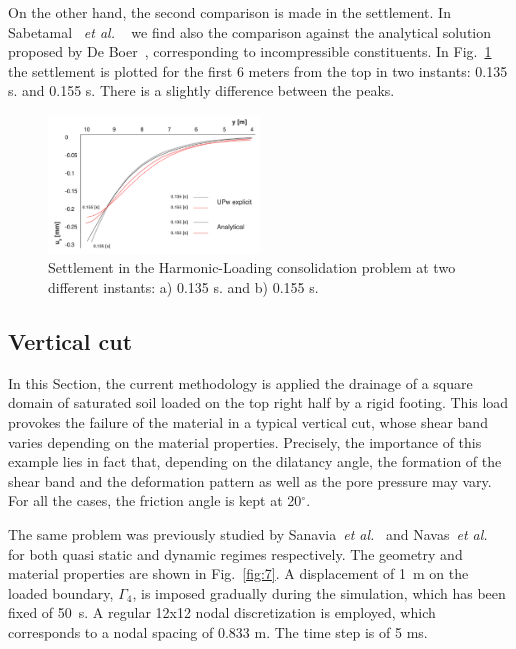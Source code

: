 \documentclass[twocolumn]{svjour3}          %
\newcommand{\etal}{
  \textit{et al.}
}
\begin{document}
On the other hand, the second comparison is made in the settlement. In Sabetamal~\etal~\cite{Sabetamal:2015} we find also the comparison against the analytical solution proposed by De Boer~\cite{deBoer:93}, corresponding to incompressible constituents. In Fig.~\ref{fig_con6} the settlement is plotted for the first 6 meters from the top in two instants: 0.135 s. and 0.155 s. There is a slightly difference between the peaks.

\begin{figure}
\begin{center}
\includegraphics[width=0.5\textwidth]{Fig/fig_disp.pdf}
\caption{Settlement in the Harmonic-Loading consolidation problem at two different instants: a) 0.135 s. and b) 0.155 s.}
\label{fig_con6}
\end{center}
\end{figure}

\subsection{Vertical cut}
\label{sec:5:2}
In this Section, the current methodology is applied the drainage of a square domain of saturated soil loaded on the top right half by a rigid footing. This load provokes the failure of the material in a typical vertical cut, whose shear band varies depending on the material properties. Precisely, the importance of this example lies in fact that, depending on the dilatancy angle, the formation of the shear band and the deformation pattern as well as the pore pressure may vary. For all the cases,  the  friction angle is kept at 20$^\circ$. 

The same problem was previously studied by Sanavia~\textit{et al.}~\cite{Sanavia:01,Sanavia:02b} and Navas~\textit{et al.}~\cite{Navas:17b,Navas:17c} for both quasi static and dynamic regimes respectively. The geometry and material properties are shown in Fig.~\ref{fig:7}. A displacement of 1~m on the loaded boundary, $\Gamma_4$, is imposed  gradually during the simulation, which has been fixed of 50~s. A regular 12x12 nodal discretization is employed, which corresponds to a nodal spacing of 0.833 m. The time step is of 5 ms.
\end{document}
